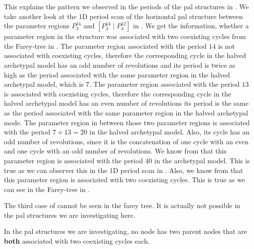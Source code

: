 This explains the pattern we observed in the periods of the \gls{pal} structures in .
We take another look at the 1D period scan of the horizontal \gls{pal} structure between the parameter regions $P^{14}_3$ and $\left[P^{14}_3  \mid P^{12}_3\right]$ in .
We get the information, whether a parameter region in the structure was associated with two coexisting cycles from the Farey-tree in .
The parameter region associated with the period $14$ is not associated with coexisting cycles, therefore the corresponding cycle in the halved archetypal model has an odd number of revolutions and its period is twice as high as the period associated with the same parameter region in the halved archetypal model, which is $7$.
The parameter region associated with the period $13$ is associated with coexisting cycles, therefore the corresponding cycle in the halved archetypal model has an even number of revolutions its period is the same as the period associated with the same parameter region in the halved archetypal mode.
The parameter region in between those two parameter regions is associated with the period $7 + 13 = 20$ in the halved archetypal model.
Also, its cycle has an odd number of revolutions, since it is the concatenation of one cycle with an even and one cycle with an odd number of revolutions.
We know from  that this parameter region is associated with the period $40$ in the archetypal model.
This is true as we can observer this in the 1D period scan in .
Also, we know from  that this parameter region is associated with two coexisting cycles.
This is true as we can see in the Farey-tree in .


The third case of  cannot be seen in the farey tree.
It is actually not possible in the \gls{pal} structures we are investigating here.

\begin{theorem}
	\label{theorem:no.parent.coex}
	In the \gls{pal} structures we are investigating, no node has two parent nodes that are \textbf{both} associated with two coexisting cycles each.
\end{theorem}

